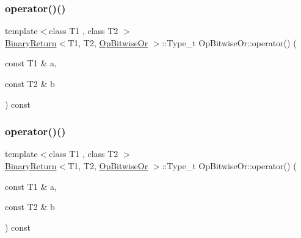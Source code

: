 \subsubsection{\texorpdfstring{operator()()}{operator()()}\hspace{0.1cm}{\footnotesize\ttfamily [1/3]}}
{\footnotesize\ttfamily template$<$class T1 , class T2 $>$ \\
\mbox{\hyperlink{structBinaryReturn}{Binary\+Return}}$<$T1, T2, \mbox{\hyperlink{structOpBitwiseOr}{Op\+Bitwise\+Or}} $>$\+::Type\+\_\+t Op\+Bitwise\+Or\+::operator() (\begin{DoxyParamCaption}\item[{const T1 \&}]{a,  }\item[{const T2 \&}]{b }\end{DoxyParamCaption}) const\hspace{0.3cm}{\ttfamily [inline]}}

\mbox{\label{structOpBitwiseOr_a05a68ce8b7a79808447ed381afb810be}} 
\subsubsection{\texorpdfstring{operator()()}{operator()()}\hspace{0.1cm}{\footnotesize\ttfamily [2/3]}}
{\footnotesize\ttfamily template$<$class T1 , class T2 $>$ \\
\mbox{\hyperlink{structBinaryReturn}{Binary\+Return}}$<$T1, T2, \mbox{\hyperlink{structOpBitwiseOr}{Op\+Bitwise\+Or}} $>$\+::Type\+\_\+t Op\+Bitwise\+Or\+::operator() (\begin{DoxyParamCaption}\item[{const T1 \&}]{a,  }\item[{const T2 \&}]{b }\end{DoxyParamCaption}) const\hspace{0.3cm}{\ttfamily [inline]}}

\mbox{\label{structOpBitwiseOr_a05a68ce8b7a79808447ed381afb810be}} 
